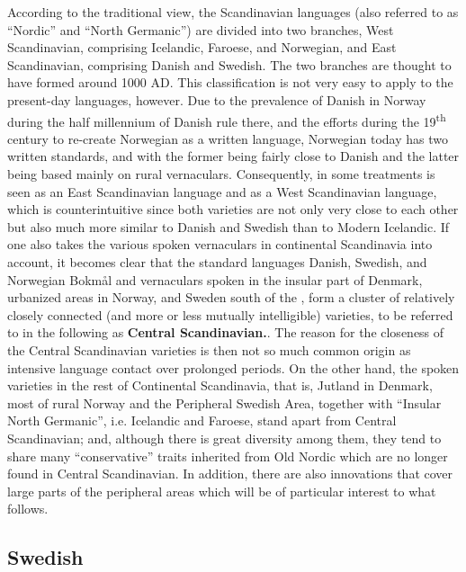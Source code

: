 According to the traditional view, the Scandinavian languages (also referred to as “Nordic” and “North Germanic”) are divided into two branches, West Scandinavian, comprising Icelandic, Faroese, and Norwegian, and East Scandinavian, comprising Danish and Swedish. The two branches are thought to have formed around 1000 AD. This classification is not very easy to apply to the present-day languages, however. Due to the prevalence of Danish in Norway during the half millennium of Danish rule there, and the efforts during the 19\textsuperscript{th} century to re-create Norwegian as a written language, Norwegian today has two written standards,  and  with the former being fairly close to Danish and the latter being based mainly on rural vernaculars. Consequently, in some treatments  is seen as an East Scandinavian language and  as a West Scandinavian language, which is counterintuitive since both varieties are not only very close to each other but also much more similar to Danish and Swedish than to Modern Icelandic. If one also takes the various spoken vernaculars in continental Scandinavia into account, it becomes clear that the standard languages Danish, Swedish, and Norwegian Bokmål and vernaculars spoken in the insular part of Denmark, urbanized areas in Norway, and Sweden south of the , form a cluster of relatively closely connected (and more or less mutually intelligible) varieties, to be referred to in the following as \textbf{Central Scandinavian}\textbf{.}. The reason for the closeness of the Central Scandinavian varieties is then not so much common origin as intensive language contact over prolonged periods. On the other hand, the spoken varieties in the rest of Continental Scandinavia, that is, Jutland in Denmark, most of rural Norway and the Peripheral Swedish Area, together with “Insular North Germanic”, i.e. Icelandic and Faroese, stand apart from Central Scandinavian; and, although there is great diversity among them, they tend to share many “conservative” traits inherited from Old Nordic which are no longer found in Central Scandinavian. In addition, there are also innovations that cover large parts of the peripheral areas which will be of particular interest to what follows. 

\subsection{ Swedish}
\label{sec:2.3.2}

